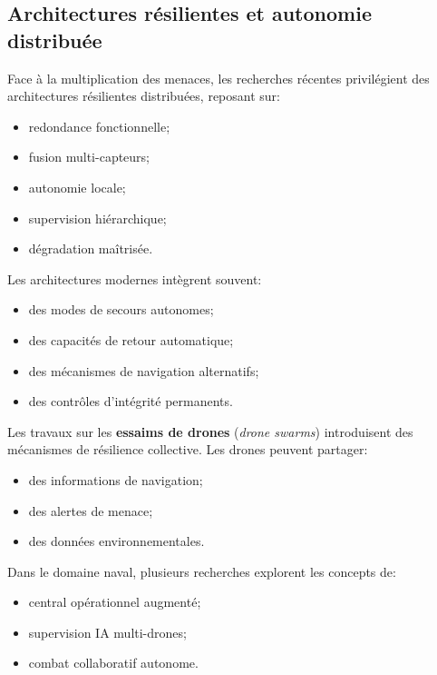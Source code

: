 \documentclass[12pt, a4paper, twoside, openright]{report}
\begin{document}
\subsection{Architectures résilientes et autonomie distribuée}
Face à la multiplication des menaces, les recherches récentes privilégient des architectures résilientes distribuées, reposant sur:
\begin{itemize}
    \item redondance fonctionnelle;
    \item fusion multi-capteurs;
    \item autonomie locale;
    \item supervision hiérarchique;
    \item dégradation maîtrisée.
\end{itemize}

Les architectures modernes intègrent souvent:
\begin{itemize}
    \item des modes de secours autonomes;
    \item des capacités de retour automatique;
    \item des mécanismes de navigation alternatifs;
    \item des contrôles d’intégrité permanents.
\end{itemize}

Les travaux sur les \textbf{essaims de drones} (\textit{drone swarms}) introduisent des mécanismes de résilience collective. Les drones peuvent partager:
\begin{itemize}
    \item des informations de navigation;
    \item des alertes de menace;
    \item des données environnementales.
\end{itemize}

Dans le domaine naval, plusieurs recherches explorent les concepts de:
\begin{itemize}
    \item central opérationnel augmenté;
    \item supervision IA multi-drones;
    \item combat collaboratif autonome.
\end{itemize}
\end{document}
